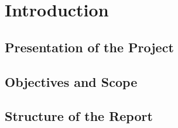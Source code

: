 \section{Introduction}

\subsection{Presentation of the Project}
\subsection{Objectives and Scope}
\subsection{Structure of the Report}







